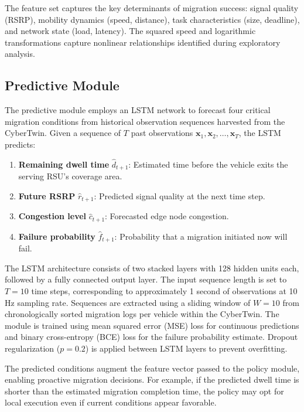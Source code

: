 \documentclass[journal,twoside]{IEEEtran}
\begin{document}
The feature set captures the key determinants of migration success: signal quality (RSRP), mobility dynamics (speed, distance), task characteristics (size, deadline), and network state (load, latency). The squared speed and logarithmic transformations capture nonlinear relationships identified during exploratory analysis.

\subsection{Predictive Module}
\label{sec:predictive}

The predictive module employs an LSTM network to forecast four critical migration conditions from historical observation sequences harvested from the CyberTwin. Given a sequence of $T$ past observations $\mathbf{x}_1, \mathbf{x}_2, \ldots, \mathbf{x}_T$, the LSTM predicts:

\begin{enumerate}
    \item \textbf{Remaining dwell time} $\hat{d}_{t+1}$: Estimated time before the vehicle exits the serving RSU's coverage area.
    \item \textbf{Future RSRP} $\hat{r}_{t+1}$: Predicted signal quality at the next time step.
    \item \textbf{Congestion level} $\hat{c}_{t+1}$: Forecasted edge node congestion.
    \item \textbf{Failure probability} $\hat{f}_{t+1}$: Probability that a migration initiated now will fail.
\end{enumerate}

The LSTM architecture consists of two stacked layers with 128 hidden units each, followed by a fully connected output layer. The input sequence length is set to $T=10$ time steps, corresponding to approximately 1 second of observations at 10\,Hz sampling rate. Sequences are extracted using a sliding window of $W=10$ from chronologically sorted migration logs per vehicle within the CyberTwin. The module is trained using mean squared error (MSE) loss for continuous predictions and binary cross-entropy (BCE) loss for the failure probability estimate. Dropout regularization ($p=0.2$) is applied between LSTM layers to prevent overfitting.

The predicted conditions augment the feature vector passed to the policy module, enabling proactive migration decisions. For example, if the predicted dwell time is shorter than the estimated migration completion time, the policy may opt for local execution even if current conditions appear favorable.
\end{document}
